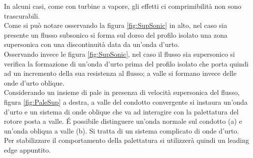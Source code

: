In alcuni casi, come con turbine a vapore, gli effetti ci comprimibilità non sono trascurabili.\\
Come si può notare osservando la figura \ref{fig:SupSonic} in alto, nel caso sia presente un flusso subsonico si forma sul dorso del profilo isolato una zona supersonica con una discontinuità data da un'onda d'urto.\\
Osservando invece le figura \ref{fig:SupSonic}, nel caso il flusso sia supersonico si verifica la formazione di un'onda d'urto prima del profilo isolato che porta quindi ad un incremento della sua resistenza al flusso; a valle si formano invece delle onde d'urto oblique.\\
Considerando un insieme di pale in presenza di velocità supersonica del flusso, figura \ref{fig:PaleSup} a destra, a valle del condotto convergente si instaura un'onda d'urto e un sistema di onde oblique che va ad interagire con la palettatura del rotore posta a valle. \'E possibile distinguere un'onda normale sul condotto (a) e un'onda obliqua a valle (b). Si tratta di un sistema complicato di onde d'urto. Per stabilizzare il comportamento della palettatura si utilizzerà quindi un leading edge appuntito.
